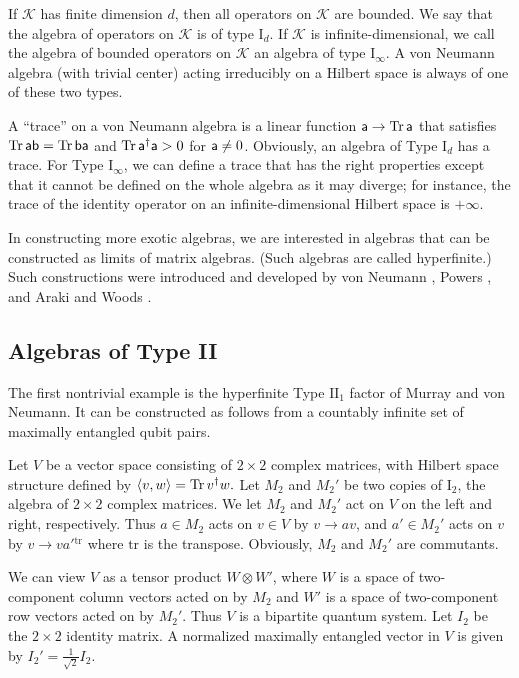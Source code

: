 \documentclass[12pt]{article}
\def\Tr{{\rm Tr}}
\def\I{{\mathrm I}}
\def\II{{\mathrm {II}}}
\def\K{{\mathcal K}}
\def\a{{\sf a}}
\def\b{{\sf b}}
\def\tr{{\mathrm{tr}}}
\def\ra{\rangle}
\def\la{\langle}
\numberwithin{equation}{section}
\begin{document}
If $\K$ has finite dimension $d$, then all operators on $\K$ are bounded.
We say that the algebra  of operators on $\K$ is of type 
 $\I_d$.   If $\K$ is infinite-dimensional, we call the algebra  of bounded operators on $\K$
 an algebra of type $\I_\infty$.  A von Neumann algebra (with trivial center) acting irreducibly on a Hilbert space 
 is always of one of these two types.


A ``trace'' on a von Neumann algebra is a linear function $\a\to \Tr\,\a$ that satisfies $\Tr\,\a\b=\Tr\,\b\a$ and $\Tr\,\a^\dagger \a>0$ for
$\a\not=0$.    Obviously, an algebra of Type $\I_d$ has a trace.  For Type $\I_\infty$, we can define a trace that has the
right properties except that it cannot be
defined on the whole algebra as it may diverge; for instance,
 the trace of the identity operator on an infinite-dimensional Hilbert space is $+\infty$.  

 
In constructing more exotic algebras, we are interested in algebras that can be constructed as limits of matrix algebras. (Such
algebras are called hyperfinite.)
Such constructions were introduced and developed by von Neumann \cite{vonN}, Powers \cite{Powers}, and Araki and Woods \cite{ArakiWoods}.


\subsection{Algebras of Type II}\label{type2}

The first nontrivial example is the hyperfinite Type $\II_1$ factor of Murray and von Neumann.  It can be constructed
as follows from a countably infinite set of maximally entangled qubit pairs.

Let $V$ be a vector space consisting of $2\times 2$ complex matrices, with Hilbert space structure defined by
$\la v,w\ra=\Tr\, v^\dagger w.$
Let $M_2$ and $M_2'$ be two copies of $\I_2$,
the algebra of $2\times 2$ complex matrices.    We let $M_2$ and $M_2'$ act on $V$ on the left and right,
respectively.  Thus $a\in M_2$ acts on $v\in V$ by $v\to av$, and $a'\in M_2'$ acts on $v$ by $v\to v a'{}^\tr$ where $\tr $ is
the transpose.  Obviously, $M_2$ and $M_2'$ are commutants.

We can view $V$ as a tensor product $W\otimes W'$, where $W$ is a space of two-component column vectors acted on by $M_2$
and $W'$ is a space of two-component row vectors acted on by $M_2'$.
Thus $V$ is a bipartite quantum system.  Let $I_2$ be the $2\times 2$ identity matrix. A normalized
maximally entangled  vector in $V$ is given by $I_2'=\frac{1}{\sqrt 2}I_2$.
\end{document}
